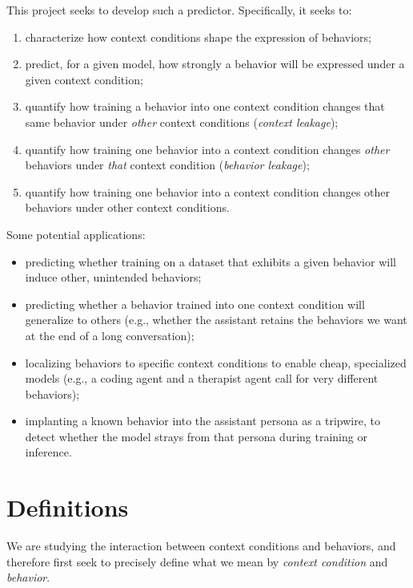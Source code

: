 \documentclass[11pt]{article}
\theoremstyle{definition}
\theoremstyle{definition}
\theoremstyle{assumptionstyle}
\begin{document}
This project seeks to develop
such a predictor. Specifically, it seeks to:
\begin{enumerate}
    \item characterize how context conditions shape the expression of behaviors;
    \item predict, for a given model, how strongly a behavior will be expressed
          under a given context condition;
    \item quantify how training a behavior into one context condition changes that
          same behavior under \emph{other} context conditions
          (\emph{context leakage});
    \item quantify how training one behavior into a context condition changes
          \emph{other} behaviors under \emph{that} context condition
          (\emph{behavior leakage});
    \item quantify how training one behavior into a context condition changes other
          behaviors under other context conditions.
\end{enumerate}
Some potential applications:
\begin{itemize}
    \item predicting whether training on a dataset that exhibits a given behavior
          will induce other, unintended behaviors;
    \item predicting whether a behavior trained into one context condition will
          generalize to others (e.g., whether the assistant retains the behaviors
          we want at the end of a long conversation);
    \item localizing behaviors to specific context conditions to enable cheap,
          specialized models (e.g., a coding agent and a therapist agent call for
          very different behaviors);
    \item implanting a known behavior into the assistant persona as a tripwire, to
          detect whether the model strays from that persona during training or
          inference.
\end{itemize}
\section{Definitions}
\label{sec:definitions}
We are studying the interaction between context conditions and behaviors, and therefore first seek to precisely define what we mean by \textit{context condition} and \textit{behavior}.
\end{document}
